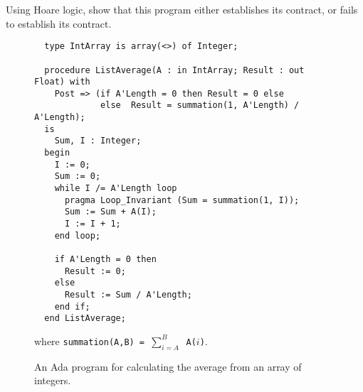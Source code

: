 Using Hoare logic, show that this program either establishes its contract, or fails to establish its contract. 

\begin{figure}[!h]
\begin{verbatim}
  type IntArray is array(<>) of Integer;

  procedure ListAverage(A : in IntArray; Result : out Float) with
    Post => (if A'Length = 0 then Result = 0 else
             else  Result = summation(1, A'Length) / A'Length);
  is
    Sum, I : Integer;
  begin
    I := 0;
    Sum := 0;
    while I /= A'Length loop
      pragma Loop_Invariant (Sum = summation(1, I));
      Sum := Sum + A(I);
      I := I + 1;
    end loop;

    if A'Length = 0 then
      Result := 0;
    else
      Result := Sum / A'Length;
    end if;
  end ListAverage;
\end{verbatim}

where {\tt summation(A,B) = $\sum_{i=A}^{B}$ \tt A($i$)}.

\caption{An Ada program for calculating the average from an array of integers.}
\label{fig:listave}
\end{figure}

